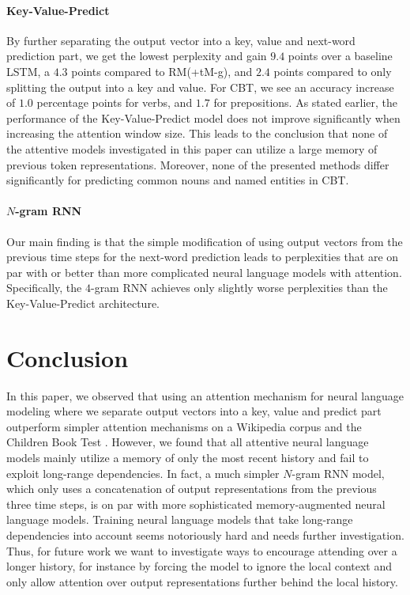 \documentclass{article}
\begin{document}
\paragraph{Key-Value-Predict} By further separating the output vector into a key, value and next-word prediction part, we get the lowest perplexity and gain $9.4$ points over a baseline LSTM, 
a $4.3$ points compared to RM(+tM-g), and $2.4$ points compared to only splitting the output into a key and value. 
For CBT, we see an accuracy increase of $1.0$ percentage points for verbs, and $1.7$ for prepositions.
As stated earlier, the performance of the Key-Value-Predict model does not improve significantly when increasing the attention window size. 
This leads to the conclusion that none of the attentive models investigated in this paper can utilize a large memory of previous token representations. 
Moreover, none of the presented methods differ significantly for predicting common nouns and named entities in CBT.

\paragraph{$N$-gram RNN} Our main finding is that the simple modification of using output vectors from the previous time steps for the next-word prediction leads to perplexities that are on par with or better than more complicated neural language models with attention.
Specifically, the $4$-gram RNN achieves only slightly worse perplexities than the Key-Value-Predict architecture.


\section{Conclusion}
In this paper, we observed that using an attention mechanism for neural language modeling where we separate output vectors into a key, value and predict part outperform simpler attention mechanisms on a Wikipedia corpus and the Children Book Test \citep[CBT,][]{hill2015goldilocks}.  
However, we found that all attentive neural language models mainly utilize a memory of only the most recent history and fail to exploit long-range dependencies.
In fact, a much simpler $N$-gram RNN model, which only uses a concatenation of output representations from the previous three time steps, is on par with more sophisticated memory-augmented neural language models.
Training neural language models that take long-range dependencies into account seems notoriously hard and needs further investigation. 
Thus, for future work we want to investigate ways to encourage attending over a longer history, for instance by forcing the model to ignore the local context and only allow attention over output representations further behind the local history.
\end{document}

